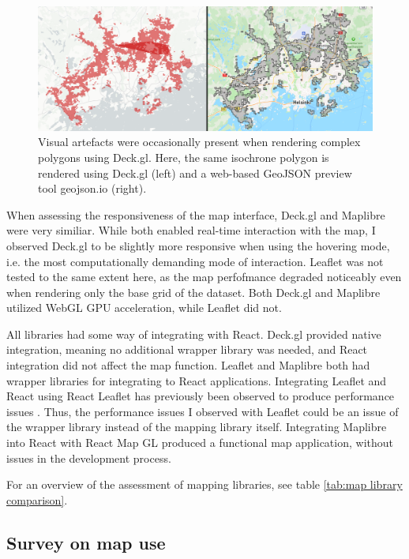 \begin{figure}[H]
	\centering
	\includegraphics[width=\textwidth]{visual/figures/screenshots/bug.png}
	\caption{
		Visual artefacts were occasionally present
		when rendering complex polygons using Deck.gl.
		Here, the same isochrone polygon is rendered using Deck.gl (left)
		and a web-based GeoJSON preview tool geojson.io (right).
	}
	\label{fig:bug}
\end{figure}

When assessing the responsiveness of the map interface,
Deck.gl and Maplibre were very similiar.
While both enabled real-time interaction with the map,
I observed Deck.gl to be slightly more responsive when using the hovering mode,
i.e. the most computationally demanding mode of interaction.
Leaflet was not tested to the same extent here,
as the map perfofmance degraded noticeably
even when rendering only the base grid of the dataset.
Both Deck.gl and Maplibre utilized WebGL GPU acceleration,
while Leaflet did not.

All libraries had some way of integrating with React.
Deck.gl provided native integration,
meaning no additional wrapper library was needed,
and React integration did not affect the map function.
Leaflet and Maplibre both had wrapper libraries for
integrating to React applications.
Integrating Leaflet and React using React Leaflet has previously
been observed to produce performance issues \parencite{gaj2023}.
Thus, the performance issues I observed with Leaflet could be an issue of
the wrapper library instead of the mapping library itself.  %
Integrating Maplibre into React with React Map GL
produced a functional map application,
without issues in the development process.

For an overview of the assessment of mapping libraries,
see table \ref{tab:map library comparison}.




\subsection{Survey on map use}

